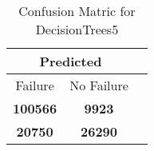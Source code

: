 \begin{table}[] 
\caption{Confusion Matric for DecisionTrees5} 
\label{Table: Prediction Accuracy-DMDDecisionTrees5OnlySunEKF-combinationReflectionEKF-top2-Reflection} 
\centering 
\begin{tabular} 
 {@{}ccc@{}} 
\toprule 
\multicolumn{2}{c}{\textbf{Predicted}}
 \\ \midrule 
\multicolumn{1}{|c|}{Failure} & 
\multicolumn{1}{c|}{No Failure}
 \\ \midrule 
\multicolumn{1}{|c|}{\color{green}\textbf{100566}} & 
\multicolumn{1}{c|}{\color{red}\textbf{9923}}
 \\ \midrule 
\multicolumn{1}{|c|}{\color{red}\textbf{20750}} & 
\multicolumn{1}{c|}{\color{green}\textbf{26290}}
 \\ \bottomrule 
\end{tabular} 
\end{table} 
